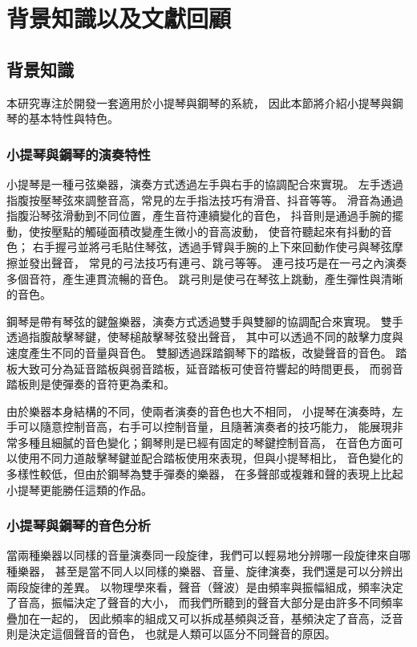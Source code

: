 \documentclass[class=NCU_thesis, crop=false]{standalone}
\begin{document}
\chapter{背景知識以及文獻回顧}

\section{背景知識}
本研究專注於開發一套適用於小提琴與鋼琴的系統，
因此本節將介紹小提琴與鋼琴的基本特性與特色。

\subsection{小提琴與鋼琴的演奏特性} \label{ch2-subst-performace-timbre-analysis}
小提琴是一種弓弦樂器，演奏方式透過左手與右手的協調配合來實現。
左手透過指腹按壓琴弦來調整音高，常見的左手指法技巧有滑音、抖音等等。
滑音為通過指腹沿琴弦滑動到不同位置，產生音符連續變化的音色，
抖音則是通過手腕的擺動，使按壓點的觸碰面積改變產生微小的音高波動，
使音符聽起來有抖動的音色；
右手握弓並將弓毛貼住琴弦，透過手臂與手腕的上下來回動作使弓與琴弦摩擦並發出聲音，
常見的弓法技巧有連弓、跳弓等等。
連弓技巧是在一弓之內演奏多個音符，產生連貫流暢的音色。
跳弓則是使弓在琴弦上跳動，產生彈性與清晰的音色。

鋼琴是帶有琴弦的鍵盤樂器，演奏方式透過雙手與雙腳的協調配合來實現。
雙手透過指腹敲擊琴鍵，使琴槌敲擊琴弦發出聲音，
其中可以透過不同的敲擊力度與速度產生不同的音量與音色。
雙腳透過踩踏鋼琴下的踏板，改變聲音的音色。
踏板大致可分為延音踏板與弱音踏板，延音踏板可使音符響起的時間更長，
而弱音踏板則是使彈奏的音符更為柔和。

由於樂器本身結構的不同，使兩者演奏的音色也大不相同，
小提琴在演奏時，左手可以隨意控制音高，右手可以控制音量，且隨著演奏者的技巧能力，
能展現非常多種且細膩的音色變化；鋼琴則是已經有固定的琴鍵控制音高，
在音色方面可以使用不同力道敲擊琴鍵並配合踏板使用來表現，但與小提琴相比，
音色變化的多樣性較低，但由於鋼琴為雙手彈奏的樂器，
在多聲部或複雜和聲的表現上比起小提琴更能勝任這類的作品。

\subsection{小提琴與鋼琴的音色分析} 
當兩種樂器以同樣的音量演奏同一段旋律，我們可以輕易地分辨哪一段旋律來自哪種樂器，
甚至是當不同人以同樣的樂器、音量、旋律演奏，我們還是可以分辨出兩段旋律的差異。
以物理學來看，聲音（聲波）是由頻率與振幅組成，頻率決定了音高，振幅決定了聲音的大小，
而我們所聽到的聲音大部分是由許多不同頻率疊加在一起的，
因此頻率的組成又可以拆成基頻與泛音，基頻決定了音高，泛音則是決定這個聲音的音色，
也就是人類可以區分不同聲音的原因。
\end{document}
